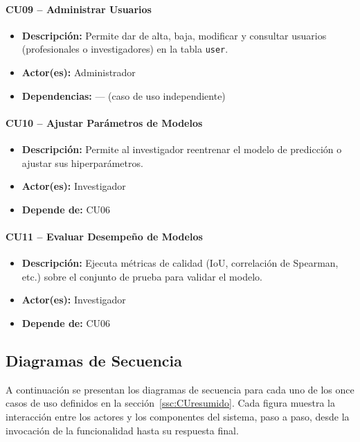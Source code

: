\paragraph{CU09 -- Administrar Usuarios}
\begin{itemize}
  \item \textbf{Descripción:} Permite dar de alta, baja, modificar y consultar usuarios (profesionales o investigadores) en la tabla \texttt{user}.
  \item \textbf{Actor(es):} Administrador
  \item \textbf{Dependencias:} — (caso de uso independiente)
\end{itemize}

\paragraph{CU10 -- Ajustar Parámetros de Modelos}
\begin{itemize}
  \item \textbf{Descripción:} Permite al investigador reentrenar el modelo de predicción o ajustar sus hiperparámetros.
  \item \textbf{Actor(es):} Investigador
  \item \textbf{Depende de:} CU06
\end{itemize}

\paragraph{CU11 -- Evaluar Desempeño de Modelos}
\begin{itemize}
  \item \textbf{Descripción:} Ejecuta métricas de calidad (IoU, correlación de Spearman, etc.) sobre el conjunto de prueba para validar el modelo.
  \item \textbf{Actor(es):} Investigador
  \item \textbf{Depende de:} CU06
\end{itemize}

\subsection{Diagramas de Secuencia}
\label{ssc:DSS}

A continuación se presentan los diagramas de secuencia para cada uno de los once casos de uso definidos en la sección~\ref{ssc:CUresumido}. Cada figura muestra la interacción entre los actores y los componentes del sistema, paso a paso, desde la invocación de la funcionalidad hasta su respuesta final.

